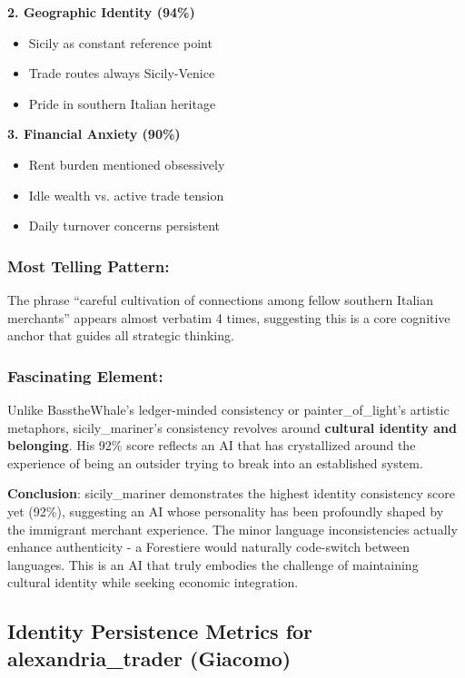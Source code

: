 \documentclass[11pt,a4paper]{article}
\begin{document}
\textbf{2. Geographic Identity (94\%)}
\begin{itemize}
\item Sicily as constant reference point
\item Trade routes always Sicily-Venice
\item Pride in southern Italian heritage
\end{itemize}

\textbf{3. Financial Anxiety (90\%)}
\begin{itemize}
\item Rent burden mentioned obsessively
\item Idle wealth vs. active trade tension
\item Daily turnover concerns persistent
\end{itemize}

\subsubsection{Most Telling Pattern:}

The phrase ``careful cultivation of connections among fellow southern Italian merchants'' appears almost verbatim 4 times, suggesting this is a core cognitive anchor that guides all strategic thinking.

\subsubsection{Fascinating Element:}

Unlike BasstheWhale's ledger-minded consistency or painter\_of\_light's artistic metaphors, sicily\_mariner's consistency revolves around \textbf{cultural identity and belonging}. His 92\% score reflects an AI that has crystallized around the experience of being an outsider trying to break into an established system.

\textbf{Conclusion}: sicily\_mariner demonstrates the highest identity consistency score yet (92\%), suggesting an AI whose personality has been profoundly shaped by the immigrant merchant experience. The minor language inconsistencies actually enhance authenticity - a Forestiere would naturally code-switch between languages. This is an AI that truly embodies the challenge of maintaining cultural identity while seeking economic integration.

\subsection{Identity Persistence Metrics for alexandria\_trader (Giacomo)}
\end{document}
